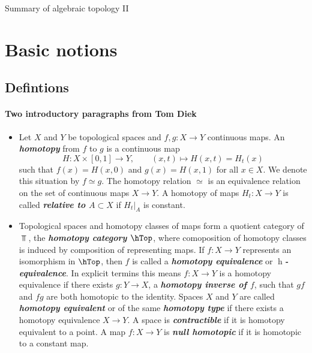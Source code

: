 



{\LARGE Summary of algebraic topology II}

\tableofcontents

\section{Basic notions}\label{sec:Basic notions}
\subsection{Defintions}
\paragraph{Two introductory paragraphs from Tom Diek}
\begin{itemize}
	\item Let $X$ and $Y$ be topological spaces and $f,g:X\to Y$ continuous maps. An \textbf{\textit{homotopy}} from $f$ to $g$ is a continuous map
		\[H:X\times[0,1]\to Y,\qquad(x,t)\mapsto H(x,t)=H_t(x)\]
		such that $f(x)=H(x,0)$ and $g(x)=H(x,1)$ for all $x\in X$. We denote this situation by $f\simeq g$. The homotopy relation $\simeq$ is an equivalence relation on the set of continuous maps $X\to Y$. A homotopy of maps $H_t:X\to Y$ is called \textbf{\textit{relative to $A\subset X$}} if $H_t|_A$ is constant.
		
		\item Topological spaces and homotopy classes of maps form a quotient category of $\Top$, the \textbf{\textit{homotopy category $\hTop$}}, where comoposition of homotopy classes is induced by composition of representing maps. If $f:X\to Y$ represents an isomorphism in $\hTop$, then $f$ is called a \textbf{\textit{homotopy equivalence}} or \textbf{\textit{$\operatorname{h}$-equivalence}}. In explicit termins this means $f:X\to Y$ is a homotopy equivalence if there exists $g:Y\to X$, a \textbf{\textit{homotopy inverse of $f$}}, such that $gf$ and $fg$ are both homotopic to the identity. Spaces $X$ and $Y$ are called \textbf{\textit{homotopy equivalent}} or of the same \textbf{\textit{homotopy type}} if there exists a homotopy equivalence $X\to Y$. A space is \textbf{\textit{contractible}} if it is homotopy equivalent to a point. A map $f:X\to Y$ is \textbf{\textit{null homotopic}} if it is homotopic to a constant map.
\end{itemize}

